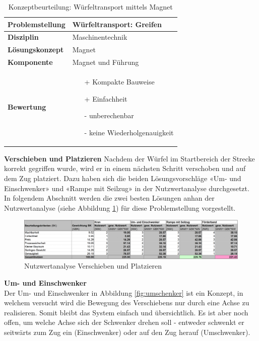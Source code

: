 \documentclass[../../../main.tex]{subfiles}
\begin{document}
 \begin{flushleft}
    \begin{table}[h]
    \begin{tabular}{ | l | p{11cm} |}
    \hline
    \textbf{Problemstellung} & Würfeltransport: Greifen \\ \hline
    \textbf{Disziplin} & Maschinentechnik \\ \hline
    \textbf{Lösungskonzept} &  Magnet \\ \hline
    \textbf{Komponente} & Magnet und Führung \\ \hline
    \textbf{Bewertung} &  \begin{itemize}
                            \item[+] Kompakte Bauweise
                            \item[+] Einfachheit
                            \item[-] unberechenbar 
                            \item[-] keine Wiederholgenauigkeit
                          \end{itemize} \\ \hline
    \end{tabular}
    \caption{Konzeptbeurteilung: Würfeltransport mittels Magnet}
    \label{tab:konzept_wurfeltrransport_magnet}
\end{table}
\end{flushleft}
\textbf{Verschieben und Platzieren}
Nachdem der Würfel im Startbereich der Strecke korrekt gegriffen wurde, wird er in einem nächsten Schritt verschoben und auf dem Zug platziert. Dazu haben sich die beiden Lösungsvorschläge «Um- und Einschwenker» und «Rampe mit Seilzug» in der Nutzwertanalyse durchgesetzt. In folgendem Abschnitt werden die zwei besten Lösungen anhan der Nutzwertanalyse (siehe Abbildung \ref{fig:verschieben_platzieren}) für diese Problemstellung vorgestellt.

\begin{figure}[H] %
    \centering
    \includegraphics[width=1\textwidth]{Verschieben_platzieren}
    \caption{Nutzwertanalyse Verschieben und Platzieren}
    \label{fig:verschieben_platzieren}
\end{figure}
\pagebreak
\textbf{Um- und Einschwenker}\\
Der Um- und Einschwenker in Abbildung \ref{fig:umschenker} ist ein Konzept, in welchem versucht wird die Bewegung des Verschiebens nur durch eine Achse zu realisieren. Somit bleibt das System einfach und übersichtlich. Es ist aber noch offen, um welche Achse sich der Schwenker drehen soll - entweder schwenkt er seitwärts zum Zug ein (Einschwenker) oder auf den Zug herauf (Umschwenker).
\end{document}
